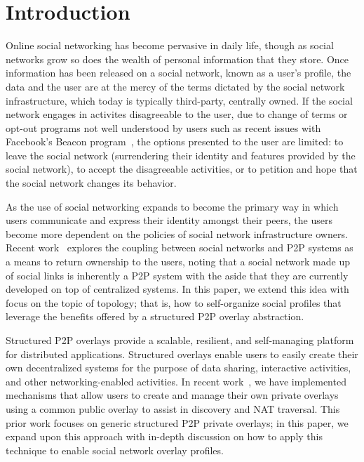 \documentclass[letterpaper,twocolumn,10pt]{article}
\begin{document}
\section{Introduction}
Online social networking has become pervasive in daily life, though as social
networks grow so does the wealth of personal information that they store.  Once
information has been released on a social network, known as a user's profile,
the data and the user are at the mercy of the terms dictated by the social network 
infrastructure, which today is typically third-party, centrally owned.  If the social
network engages in activites disagreeable to the user, due to change of terms or
opt-out programs not well understood by users such as recent issues
with Facebook's Beacon program~\cite{facebook_beacon}, the options presented to the user are limited:
to leave the social network (surrendering their identity and features provided
by the social network), to accept the disagreeable activities, or to petition
and hope that the social network changes its behavior. 

As the use of social networking expands to become the primary way in which users
communicate and express their identity amongst their peers, the users become
more dependent on the policies of social network infrastructure owners.  Recent
work~\cite{p2p_socialnetwork} explores the coupling between social networks and
P2P systems as a means to return ownership to the users, noting that a social
network made up of social links is inherently a P2P system with the aside that
they are currently developed on top of centralized systems.  In this paper, we
extend this idea with focus on the topic of topology; that is, how to self-organize
social profiles that leverage the benefits offered by a structured P2P overlay abstraction.

Structured P2P overlays provide a scalable, resilient, and self-managing
platform for distributed applications.  Structured overlays enable users to
easily create their own decentralized systems for the purpose of data sharing,
interactive activities, and other networking-enabled activities.  In recent
work~\cite{icdcs10}, we have implemented mechanisms that allow users to create
and manage their own private overlays using a common public overlay to assist
in discovery and NAT traversal. This prior work focuses on generic structured
P2P private overlays; in this paper, we
expand upon this approach with in-depth discussion on how to apply this technique to
enable social network overlay profiles.
\end{document}
